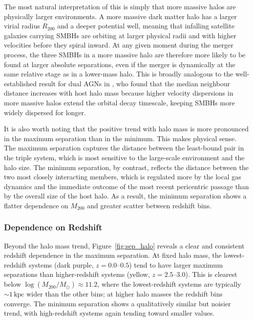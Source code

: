 \documentclass[twocolumn, 10pt]{article}
\begin{document}
The most natural interpretation of this is simply that more massive halos are physically larger environments. A more massive dark matter halo has a larger virial radius $R_{200}$ and a deeper potential well, meaning that infalling satellite galaxies carrying SMBHs are orbiting at larger physical radii and with higher velocities before they spiral inward. At any given moment during the merger process, the three SMBHs in a more massive halo are therefore more likely to be found at larger absolute separations, even if the merger is dynamically at the same relative stage as in a lower-mass halo. This is broadly analogous to the well-established result for dual AGNs in \citet{Saeedzadeh2024}, who found that the median neighbour distance increases with host halo mass because higher velocity dispersions in more massive halos extend the orbital decay timescale, keeping SMBHs more widely dispersed for longer.
 
It is also worth noting that the positive trend with halo mass is more pronounced in the maximum separation than in the minimum. This makes physical sense. The maximum separation captures the distance between the least-bound pair in the triple system, which is most sensitive to the large-scale environment and the halo size. The minimum separation, by contrast, reflects the distance between the two most closely interacting members, which is regulated more by the local gas dynamics and the immediate outcome of the most recent pericentric passage than by the overall size of the host halo. As a result, the minimum separation shows a flatter dependence on $M_{200}$ and greater scatter between redshift bins.
 
\subsubsection{Dependence on Redshift}
\label{subsubsec:sep_vs_z}
 
Beyond the halo mass trend, Figure~\ref{fig:sep_halo} reveals a clear and consistent redshift dependence in the maximum separation. At fixed halo mass, the lowest-redshift systems (dark purple, $z = 0.0$--$0.5$) tend to have larger maximum separations than higher-redshift systems (yellow, $z = 2.5$--$3.0$). This is clearest below $\log(M_{200}/M_\odot) \approx 11.2$, where the lowest-redshift systems are typically $\sim 1\,\mathrm{kpc}$ wider than the other bins; at higher halo masses the redshift bins converge. The minimum separation shows a qualitatively similar but noisier trend, with high-redshift systems again tending toward smaller values.
 
\end{document}
